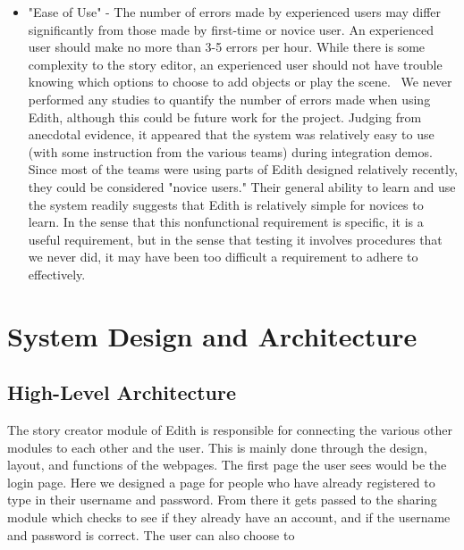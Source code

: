 \documentclass[12pt]{article}
\begin{document}
\begin{itemize}

\item "Ease of Use" - 	The number of errors made by experienced users may differ significantly from those made by first-time or novice user. An experienced user should make no more than 3-5 errors per hour. While there is some complexity to the story editor, an experienced user should not have trouble knowing which options to choose to add objects or play the scene.
\ We never performed any studies to quantify the number of errors made when using Edith, although this could be future work for the project. Judging from anecdotal evidence, it appeared that the system was relatively easy to use (with some instruction from the various teams) during integration demos. Since most of the teams were using parts of Edith designed relatively recently, they could be considered "novice users." Their general ability to learn and use the system readily suggests that Edith is relatively simple for novices to learn. In the sense that this nonfunctional requirement is specific, it is a useful requirement, but in the sense that testing it involves procedures that we never did, it may have been too difficult a requirement to adhere to effectively.

\end{itemize}
\section{System Design and Architecture}

\subsection{High-Level Architecture}
The story creator module of Edith is responsible for connecting the various other modules to each other and the user. This is mainly done through the design, layout, and functions of the webpages. The first page the user sees would be the login page. Here we designed a page for people who have already registered to type in their username and password. From there it gets passed to the sharing module which checks to see if they already have an account, and if the username and password is correct. The user can also choose to 
\end{document}

